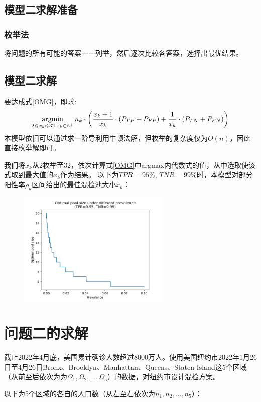 \documentclass[withoutpreface,bwprint]{cumcmthesis} %
\begin{document}
\subsection{模型二求解准备}
\subsubsection{枚举法}
将问题的所有可能的答案一一列举，然后逐次比较各答案，选择出最优结果。
\subsection{模型二求解}
要达成式\ref{OMG}，即求:
\begin{align}
    \operatorname*{\rm argmin}_{2\leqslant x_k \leqslant 32,x_k\in\mathbb{Z}^+}n_k\cdot\left(\dfrac{x_k+1}{x_k}\cdot (P_{TP}+P_{FP})+\dfrac{1}{x_k}\cdot (P_{TN}+P_{FN})\right)
\end{align}
本模型依旧可以通过求一阶导利用牛顿法解，但枚举的复杂度仅为$O(n)$，因此直接枚举解即可。

我们将$x_k$从2枚举至32，依次计算式\ref{OMG}中argmax内代数式的值，从中选取使该式取到最大值的$x_k$作为结果。
以下为$TPR=95\%$, $TNR=99\%$时，本模型对部分阳性率$\rho_k$区间给出的最佳混检池大小$x_k$：
\begin{figure}[H]
\centering
\includegraphics[width=0.65\textwidth]{model2_sample.png}
\label{model2_sample}
\end{figure}
\section{问题二的求解}
截止2022年4月底，美国累计确诊人数超过8000万人。使用美国纽约市2022年1月26日至4月26日Bronx、Brooklyn、Manhattan、Queens、Staten Island这5个区域（从前至后依次为为$\Omega_1 ,\Omega_2 ,...,\Omega_5$）的数据，对纽约市设计混检方案。

以下为5个区域的各自的人口数（从左至右依次为$n_1,n_2,...,n_5$）：
\end{document}
